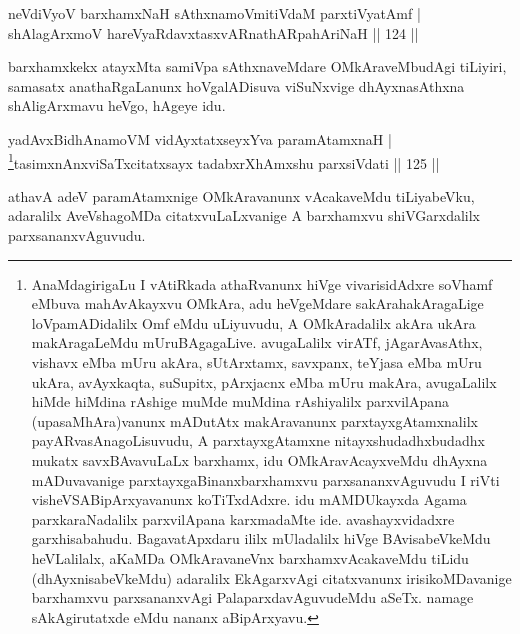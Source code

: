 
\begin{shl}
neVdiVyoV barxhamxNaH sAthxnamoVmitiVdaM parxtiVyatAmf  | \\
shAlagArxmoV hareVyaRdavxtasxvARnathARpahAriNaH \hfill||  124 ||  
\end{shl}

\begin{artha}
barxhamxkekx atayxMta samiVpa sAthxnaveMdare OMkAraveMbudAgi tiLiyiri, samasatx anathaRgaLanunx hoVgalADisuva viSuNxvige dhAyxnasAthxna shAligArxmavu heVgo, hAgeye idu. 
\end{artha}


\begin{shl}
yadAvx\s BidhAnamoVM vidAyxtatxseyxYva paramAtamxnaH  | \\
\footnote{AnaMdagirigaLu I vAtiRkada athaRvanunx hiVge vivarisidAdxre \mdash  soV\s hamf eMbuva mahAvAkayxvu OMkAra, adu heVgeMdare sakArahakAragaLige loVpamADidalilx Omf eMdu uLiyuvudu, A OMkAradalilx akAra ukAra makAragaLeMdu mUruBAgagaLive. avugaLalilx virATf, jAgarAvasAthx, vishavx eMba mUru akAra, sUtArxtamx, savxpanx, teYjasa eMba mUru ukAra, avAyxkaqta, suSupitx, pArxjacnx eMba mUru makAra, avugaLalilx hiMde hiMdina rAshige muMde muMdina rAshiyalilx parxvilApana (upasaMhAra)vanunx mADutAtx makAravanunx parxtayxgAtamxnalilx payARvasAnagoLisuvudu, A parxtayxgAtamxne nitayxshudadhxbudadhx mukatx savxBAvavuLaLx barxhamx, idu OMkAravAcayxveMdu dhAyxna mADuvavanige parxtayxgaBinanxbarxhamxvu parxsananxvAguvudu \mdash  I riVti visheVSABipArxyavanunx koTiTxdAdxre. idu mAMDUkayxda Agama parxkaraNadalilx parxvilApana karxmadaMte ide. avashayxvidadxre garxhisabahudu. BagavatApxdaru ililx mUladalilx hiVge BAvisabeVkeMdu heVLalilalx, aKaMDa OMkAravaneVnx barxhamxvAcakaveMdu tiLidu (dhAyxnisabeVkeMdu) adaralilx EkAgarxvAgi citatxvanunx irisikoMDavanige barxhamxvu parxsananxvAgi PalaparxdavAguvudeMdu aSeTx. namage sAkAgirutatxde eMdu nananx aBipArxyavu.}tasimxnAnxviSaTxcitatxsayx tadabxrXhAmx\s \s shu parxsiVdati \hfill||  125 ||  
\end{shl}

\begin{artha}
athavA adeV paramAtamxnige OMkAravanunx vAcakaveMdu tiLiyabeVku, adaralilx AveVshagoMDa citatxvuLaLxvanige A barxhamxvu shiVGarxdalilx parxsananxvAguvudu.
\end{artha}

